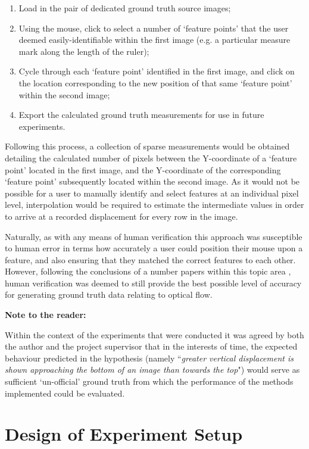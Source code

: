 \begin{enumerate}
	\item Load in the pair of dedicated ground truth source images;
	\item Using the mouse, click to select a number of `feature points' that the user deemed easily-identifiable within the first image (e.g. a particular measure mark along the length of the ruler);
	\item Cycle through each `feature point' identified in the first image, and click on the location corresponding to the new position of that same `feature point' within the second image;
	\item Export the calculated ground truth measurements for use in future experiments. 
\end{enumerate}

Following this process, a collection of sparse measurements would be obtained detailing the calculated number of pixels between the Y-coordinate of a `feature point' located in the first image, and the Y-coordinate of the corresponding `feature point' subsequently located within the second image. As it would not be possible for a user to manually identify and select features at an individual pixel level, interpolation would be required to estimate the intermediate values in order to arrive at a recorded displacement for every row in the image.

Naturally, as with any means of human verification this approach was susceptible to human error in terms how accurately a user could position their mouse upon a feature, and also ensuring that they matched the correct features to each other. However, following the conclusions of a number papers within this topic area \cite{kondermann} \cite{haltakov}, human verification was deemed to still provide the best possible level of accuracy for generating ground truth data relating to optical flow.

\textbf{Note to the reader:}

Within the context of the experiments that were conducted it was agreed by both the author and the project supervisor that in the interests of time, the expected behaviour predicted in the hypothesis (namely  ``\textit{greater vertical displacement is shown approaching the bottom of an image than towards the top}") would serve as sufficient `un-official' ground truth from which the performance of the methods implemented could be evaluated.

\section{Design of Experiment Setup}

